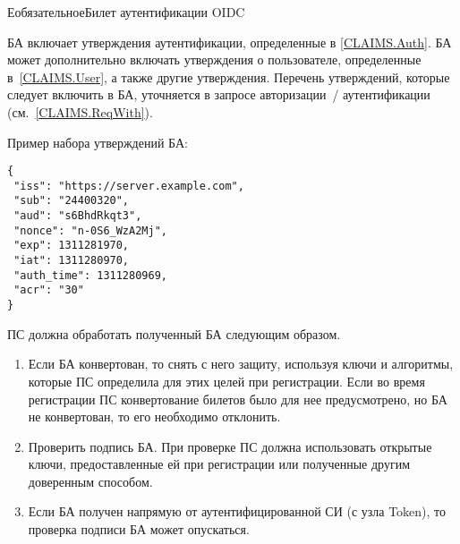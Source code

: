 \begin{appendix}{Е}{обязательное}{Билет аутентификации OIDC}\label{IDTOKEN}

\label{IDTOKEN.Structure}

БА включает утверждения аутентификации, определенные в \ref{CLAIMS.Auth}.
БА может дополнительно включать утверждения о пользователе, 
определенные в~\ref{CLAIMS.User}, а также другие утверждения.
% 
Перечень утверждений, которые следует включить в БА, уточняется в 
запросе авторизации~/ аутентификации (см.~\ref{CLAIMS.ReqWith}).

Пример набора утверждений БА:
\begin{lstlisting}
{
 "iss": "https://server.example.com",
 "sub": "24400320",
 "aud": "s6BhdRkqt3",
 "nonce": "n-0S6_WzA2Mj",
 "exp": 1311281970,
 "iat": 1311280970,
 "auth_time": 1311280969,
 "acr": "30"
}
\end{lstlisting}


%
%

\label{IDTOKEN.Process}

ПС должна обработать полученный БА следующим образом.

\begin{enumerate}
\item 
Если БА конвертован, то снять с него защиту, используя ключи и алгоритмы, 
которые ПС определила для этих целей при регистрации.
%
Если во время регистрации ПС конвертование билетов было для нее
предусмотрено, но БА не конвертован, то его необходимо отклонить.

\item 
Проверить подпись БА. При проверке ПС должна использовать открытые ключи, 
предоставленные ей при регистрации или полученные другим доверенным способом. 

\item 
Если БА получен напрямую от аутентифицированной СИ (с узла Token), 
то проверка подписи БА может опускаться.


\end{enumerate}
\end{appendix}
